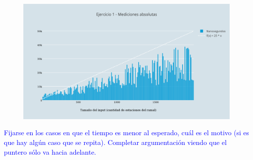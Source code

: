   \begin{figure}[h!]
   \begin{center}
 	\includegraphics[scale=0.8]{imagenes/ej1/absolutas.png}
	\label{estaciones}
   \end{center}
 \end{figure}


\newpage

{\huge \textcolor{blue}{Fijarse en los casos en que el tiempo es menor al esperado, cuál es el motivo (si es que hay algún caso que se repita). Completar argumentación viendo que el puntero sólo va hacia adelante.}}

